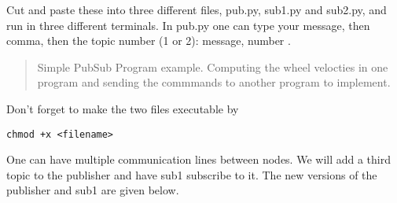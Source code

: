 Cut and paste these into three different files, pub.py, sub1.py and
sub2.py, and run in three different terminals. In pub.py one can type
your message, then comma, then the topic number (1 or 2): {message,
number} .

\begin{quote}
Simple PubSub Program example. Computing the wheel velocties in one
program and sending the commmands to another program to implement.
\end{quote}

Don't forget to make the two files executable by

\begin{verbatim}
chmod +x <filename>
\end{verbatim}

One can have multiple communication lines between nodes. We will add a
third topic to the publisher and have sub1 subscribe to it. The new
versions of the publisher and sub1 are given below.

